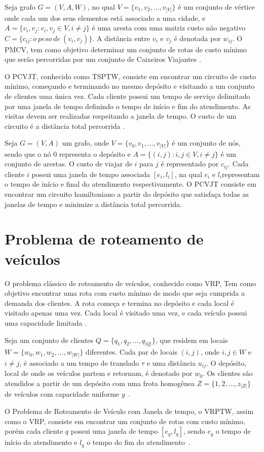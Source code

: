 Seja grafo $G = (V,A,W)$, no qual $V = \{v_1, v_2, ..., v_{|V|}\}$ é um conjunto de vértice onde cada um dos seus elementos está associado a uma cidade, e $A = \{ v_i,v_j: v_i,v_j \in V, i \neq j \}$ é uma aresta com uma matriz custo não negativo $C = \{c_{ij}: o \ peso \ de \ (v_i,v_j)\}$. A distância entre $v_i$ e $v_j$ é denotada por $w_{ij}$. O \ac{PMCV}, tem como objetivo determinar um conjunto de rotas de custo mínimo que serão percorridas por um conjunto de Caixeiros Viajantes \cite{meng:2012}. 

O \ac{PCVJT}, conhecido como \ac{TSPTW}, consiste em encontrar um circuito de custo mínimo, começando e terminando no mesmo depósito e visitando a um conjunto de clientes uma única vez. Cada cliente possui um tempo de serviço delimitado por uma janela de tempo definindo o tempo de início e fim do atendimento. As visitas devem ser realizadas respeitando a janela de tempo. O custo de um circuito é a distância total percorrida \cite{urrutia:2010}.

Seja $G=(V,A)$ um grafo, onde $V = \{v_0, v_1, ..., v_{|V|} \}$ é um conjunto de nós, sendo que o nó $0$ representa o depósito e $A = \{ (i,j): i,j \in V, i \neq j \}$ é um conjunto de arestas. O custo de viajar de $i$ para $j$ é representado por $c_{ij}$. Cada cliente $i$ possui uma janela de tempo associada $[e_i, l_i]$, na qual $e_i$ e $l_i$representam o tempo de início e final do atendimento respectivamente. O \ac{PCVJT} consiste em encontrar um circuito hamiltoniano a partir do depósito que satisfaça todas as janelas de tempo e minimize a distância total percorrida\cite{urrutia:2010}.

\section{Problema de roteamento de veículos}

O problema clássico de roteamento de veículos, conhecido como \ac{VRP}, Tem como objetivo encontrar uma rota com custo mínimo de modo que seja cumprida a demanda dos clientes. A rota começa e termina no depósito e cada local é visitado apenas uma vez. Cada local é visitado uma vez, e cada veículo possui uma capacidade limitada \cite{gold:2008}.

Seja um conjunto de clientes $Q = \{q_1, q_2, ..., q_{|Q|}\}$, que residem em locais $W = \{w_0, w_1, w_2, ..., w_{|W|}\}$ diferentes. Cada par de locais $(i,j)$, onde  $i,j \in W$ e $i \neq j$, é associado a um tempo de translado $\tau$ e uma distância $u_{ij}$. O depósito, local de onde os veículos partem e retornam, é denotado por $w_0$.
Os clientes são atendidos a partir de um depósito com uma frota  homogênea $Z = \{1, 2, ..., z_{|Z|}\}$ de veículos com capacidade uniforme $y$~\cite{gold:2008}.

O Problema de Roteamento de Veículo com Janela de tempo, o \ac{VRPTW}, assim como o \ac{VRP}, consiste em encontrar um conjunto de rotas com custo mínimo, porém cada cliente $q$ possui uma janela de tempo $[e_{q}, l_{q}]$, sendo $e_{q}$ o tempo de início do atendimento e $l_{q}$ o tempo do fim do atendimento~\cite{gold:2008}.